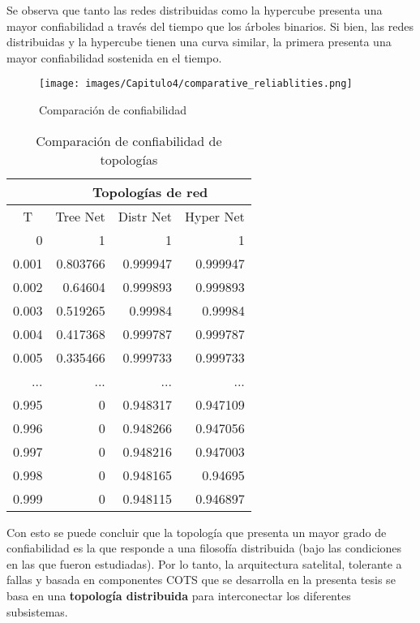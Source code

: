 Se observa que tanto las redes distribuidas como la hypercube presenta una mayor confiabilidad a través del tiempo que  los árboles binarios. Si bien, las redes distribuidas y la hypercube tienen una curva similar, la primera presenta una mayor confiabilidad sostenida en el tiempo.

\begin{figure}[H]
 \centering
 \texttt{[image: images/Capitulo4/comparative\_reliablities.png]}
  \caption{Comparación de confiabilidad}
\label{fig:comparative_reliablities}
\end{figure}

\begin{table}[H]
\centering
\caption{Comparación de confiabilidad de topologías}
\label{table_comprative_reliability}
\begin{tabular}{r|r|r|r|}
\cline{2-4}
\multicolumn{1}{l|}{} & \multicolumn{3}{c|}{Topologías de red} \\ \hline
\multicolumn{1}{|c|}{T} & \multicolumn{1}{c|}{Tree Net} & \multicolumn{1}{c|}{Distr Net} & \multicolumn{1}{c|}{Hyper Net} \\ \hline
\multicolumn{1}{|r|}{0} & 1 & 1 & 1 \\ \hline
\multicolumn{1}{|r|}{0.001} & 0.803766 & 0.999947 & 0.999947 \\ \hline
\multicolumn{1}{|r|}{0.002} & 0.64604 & 0.999893 & 0.999893 \\ \hline
\multicolumn{1}{|r|}{0.003} & 0.519265 & 0.99984 & 0.99984 \\ \hline
\multicolumn{1}{|r|}{0.004} & 0.417368 & 0.999787 & 0.999787 \\ \hline
\multicolumn{1}{|r|}{0.005} & 0.335466 & 0.999733 & 0.999733 \\ \hline
\multicolumn{1}{|r|}{...} & ... & ... & ... \\ \hline
\multicolumn{1}{|r|}{0.995} & 0 & 0.948317 & 0.947109 \\ \hline
\multicolumn{1}{|r|}{0.996} & 0 & 0.948266 & 0.947056 \\ \hline
\multicolumn{1}{|r|}{0.997} & 0 & 0.948216 & 0.947003 \\ \hline
\multicolumn{1}{|r|}{0.998} & 0 & 0.948165 & 0.94695 \\ \hline
\multicolumn{1}{|r|}{0.999} & 0 & 0.948115 & 0.946897 \\ \hline
\end{tabular}
\end{table}


Con esto se puede concluir que la topología que presenta un mayor grado de confiabilidad es la que responde a una filosofía distribuida (bajo las condiciones en las que fueron estudiadas). Por lo tanto, la arquitectura satelital, tolerante a fallas y basada en componentes COTS que se desarrolla en la presenta tesis se basa en una \textbf{topología distribuida} para interconectar los diferentes subsistemas.

